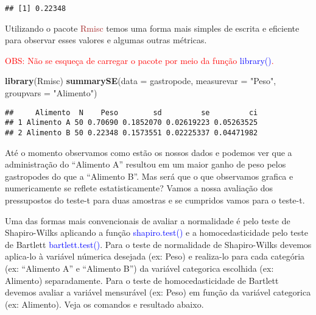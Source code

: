 \documentclass[14pt,titlepage, oneside, openany, a4paper]{book}
\newenvironment{Shaded}{\begin{snugshade}}{\end{snugshade}}
\newcommand{\DataTypeTok}[1]{\textcolor[rgb]{0.13,0.29,0.53}{#1}}
\newcommand{\KeywordTok}[1]{\textcolor[rgb]{0.13,0.29,0.53}{\textbf{#1}}}
\newcommand{\NormalTok}[1]{#1}
\newcommand{\OperatorTok}[1]{\textcolor[rgb]{0.81,0.36,0.00}{\textbf{#1}}}
\newcommand{\StringTok}[1]{\textcolor[rgb]{0.31,0.60,0.02}{#1}}
\begin{document}
\begin{verbatim}
## [1] 0.22348
\end{verbatim}

Utilizando o pacote \textcolor{brown}{Rmisc} temos uma forma mais simples de escrita e eficiente para observar esses valores e algumas outras métricas.

\textcolor{red}{OBS: Não se esqueça de carregar o pacote por meio da função} \textcolor{blue}{library()}\textcolor{red}{.}

\begin{Shaded}
\begin{Highlighting}[]
\KeywordTok{library}\NormalTok{(Rmisc)}
\KeywordTok{summarySE}\NormalTok{(}\DataTypeTok{data =}\NormalTok{ gastropode, }\DataTypeTok{measurevar =} \StringTok{"Peso"}\NormalTok{, }\DataTypeTok{groupvars =} \StringTok{"Alimento"}\NormalTok{)}
\end{Highlighting}
\end{Shaded}

\begin{verbatim}
##     Alimento  N    Peso        sd         se         ci
## 1 Alimento A 50 0.70690 0.1852070 0.02619223 0.05263525
## 2 Alimento B 50 0.22348 0.1573551 0.02225337 0.04471982
\end{verbatim}

Até o momento observamos como estão os nossos dados e podemos ver que a administração do ``Alimento A'' resultou em um maior ganho de peso pelos gastropodes do que a ``Alimento B''. Mas será que o que observamos grafica e numericamente se reflete estatisticamente? Vamos a nossa avaliação dos pressupostos do teste-t para duas amostras e se cumpridos vamos para o teste-t.

Uma das formas mais convencionais de avaliar a normalidade é pelo teste de Shapiro-Wilks aplicando a função \textcolor{blue}{shapiro.test()} e a homocedasticidade pelo teste de Bartlett \textcolor{blue}{bartlett.test()}. Para o teste de normalidade de Shapiro-Wilks devemos aplica-lo à variável númerica desejada (ex: Peso) e realiza-lo para cada categória (ex: ``Alimento A'' e ``Alimento B'') da variável categorica escolhida (ex: Alimento) separadamente. Para o teste de homocedasticidade de Bartlett devemos avaliar a variável mensurável (ex: Peso) em função da variável categorica (ex: Alimento). Veja os comandos e resultado abaixo.

\begin{Shaded}
\end{Shaded}
\end{document}
